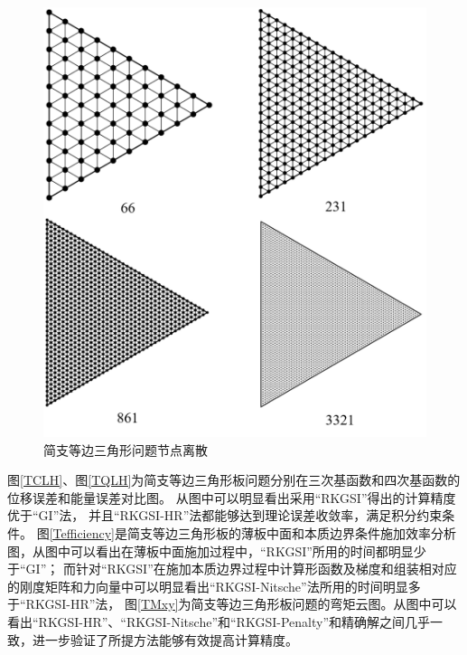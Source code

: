 \begin{figure}[H]
    \centering
    \includegraphics[scale=0.4]{figure/PHR/T/triangularmsh.png}
    \caption{简支等边三角形问题节点离散}\label{triangularmsh}
\end{figure}
图\ref{TCLH}、图\ref{TQLH}为简支等边三角形板问题分别在三次基函数和四次基函数的位移误差和能量误差对比图。
从图中可以明显看出采用“RKGSI”得出的计算精度优于“GI”法，
并且“RKGSI-HR”法都能够达到理论误差收敛率，满足积分约束条件。
图\ref{Tefficiency}是简支等边三角形板的薄板中面和本质边界条件施加效率分析图，从图中可以看出在薄板中面施加过程中，“RKGSI”所用的时间都明显少于“GI”；
而针对“RKGSI”在施加本质边界过程中计算形函数及梯度和组装相对应的刚度矩阵和力向量中可以明显看出“RKGSI-Nitsche”法所用的时间明显多于“RKGSI-HR”法，
图\ref{TMxy}为简支等边三角形板问题的弯矩云图。从图中可以看出“RKGSI-HR”、“RKGSI-Nitsche”和“RKGSI-Penalty”和精确解之间几乎一致，进一步验证了所提方法能够有效提高计算精度。
